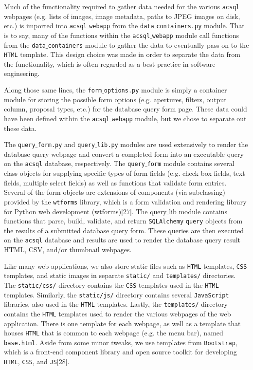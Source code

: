 \documentclass[10pt,journal,compsoc]{IEEEtran}
\begin{document}
Much of the functionality required to gather data needed for the various \texttt{acsql} webpages (e.g. lists of images, image metadata, paths to JPEG images on disk, etc.) is imported
into \texttt{acsql$\_$webapp} from the \texttt{data$\_$containers.py} module.  That is to say, many of the functions within the \texttt{acsql$\_$webapp} module call functions from
the \texttt{data$\_$containers} module to gather the data to eventually pass on to the \texttt{HTML} template.  This design choice was made in order to separate the data from the
functionality, which is often regarded as a best practice in software engineering.

Along those same lines, the \texttt{form$\_$options.py} module is simply a container module for storing the possible form options (e.g. apertures, filters, output column, proposal types,
etc.) for the database query form page.  These data could have been defined within the \texttt{acsql$\_$webapp} module, but we chose to separate out these data.

The \texttt{query$\_$form.py} and \texttt{query$\_$lib.py} modules are used extensively to render the database query webpage and convert a completed form into an executable query on
the \texttt{acsql} database, respectively.  The \texttt{query$\_$form} module contains several class objects for supplying specific types of form fields (e.g. check box fields, text fields,
multiple select fields) as well as functions that validate form entries.  Several of the form objects are extensions of components (via subclassing) provided by the \texttt{wtforms} library,
which is a form validation and rendering library for Python web development (wtforms)[27].  The {query$\_$lib} module contains functions that parse, build, validate, and return \texttt{SQLAlchemy}
\texttt{query} objects from the results of a submitted database query form.  These queries are then executed on the \texttt{acsql} database and results are used to render the database query
result HTML, CSV, and/or thumbnail webpages.

Like many web applications, we also store static files such as \texttt{HTML} templates, \texttt{CSS} templates, and static images in separate \texttt{static/} and \texttt{templates/} directories.
The \texttt{static/css/} directory contains the \texttt{CSS} templates used in the \texttt{HTML} templates.  Similarly, the \texttt{static/js/} directory contains several \texttt{JavaScript} libraries,
also used in the \texttt{HTML} templates. Lastly, the \texttt{templates/} directory contains the \texttt{HTML} templates used to render the various webpages of the web application.  There is one
template for each webpage, as well as a template that houses \texttt{HTML} that is common to each webpage (e.g. the menu bar), named \texttt{base.html}. Aside from some minor tweaks, we use
templates from \texttt{Bootstrap}, which is a front-end component library and open source toolkit for developing \texttt{HTML}, \texttt{CSS}, and \texttt{JS}[28].
\end{document}
